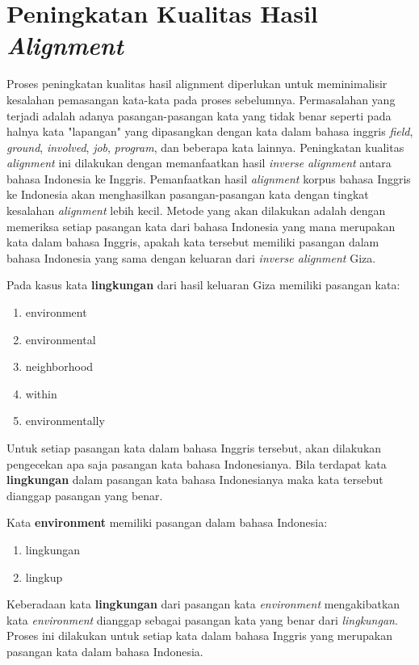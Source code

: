 \section{Peningkatan Kualitas Hasil \textit{Alignment}}
Proses peningkatan kualitas hasil alignment diperlukan untuk meminimalisir kesalahan pemasangan kata-kata pada proses sebelumnya. Permasalahan  yang terjadi adalah adanya pasangan-pasangan kata yang tidak benar seperti pada halnya kata "lapangan" yang  dipasangkan dengan kata dalam bahasa inggris \textit{field}, \textit{ground}, \textit{involved}, \textit{job}, \textit{program}, dan beberapa kata lainnya. Peningkatan kualitas \textit{alignment} ini dilakukan dengan memanfaatkan hasil \textit{inverse} \textit{alignment} antara bahasa Indonesia ke Inggris. Pemanfaatkan hasil \textit{alignment} korpus bahasa Inggris ke Indonesia akan menghasilkan pasangan-pasangan kata dengan tingkat kesalahan \textit{alignment} lebih kecil. Metode yang akan dilakukan adalah dengan memeriksa setiap pasangan kata dari bahasa Indonesia yang mana merupakan kata dalam bahasa Inggris, apakah kata tersebut memiliki pasangan dalam bahasa Indonesia yang sama dengan keluaran dari \textit{inverse alignment} Giza.

Pada kasus kata \textbf{lingkungan} dari hasil keluaran Giza memiliki pasangan kata:

\begin{enumerate}
	\item environment
	\item environmental
	\item neighborhood
	\item within
	\item environmentally
\end{enumerate}

Untuk setiap pasangan kata dalam bahasa Inggris tersebut, akan dilakukan pengecekan apa saja pasangan kata bahasa Indonesianya. Bila terdapat kata \textbf{lingkungan} dalam pasangan kata bahasa Indonesianya maka kata tersebut dianggap pasangan yang benar.

Kata \textbf{environment} memiliki pasangan dalam bahasa Indonesia:

\begin{enumerate}
	\item lingkungan
	\item lingkup
\end{enumerate}

Keberadaan kata \textbf{lingkungan} dari pasangan kata \textit{environment} mengakibatkan kata \textit{environment} dianggap sebagai pasangan kata yang benar dari \textit{lingkungan}. Proses ini dilakukan untuk setiap kata dalam bahasa Inggris yang merupakan pasangan kata dalam bahasa Indonesia.
